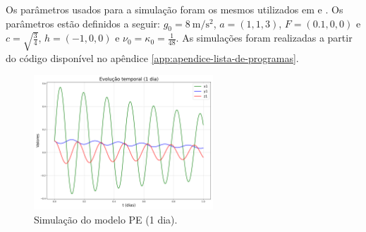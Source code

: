 Os parâmetros usados para a simulação foram os mesmos utilizados em \citet{Lorenz1980} e \cite{Chekroun2021}. Os parâmetros estão definidos a seguir: $g_0 = \SI{8}{\meter\per\square\second}$, $a = (1, 1, 3)$, $F = (0.1, 0, 0)$ e $c = \sqrt{\tfrac{3}{4}}$, $h=(-1, 0, 0)$ e $\nu_0 = \kappa_0 = \frac{1}{48}$. As simulações foram realizadas a partir do código disponível no apêndice \ref{app:apendice-lista-de-programas}.  

\begin{figure}[H]
	\centering
	\includegraphics[width=0.6\textwidth]{00_TCC/01_LATEX/figuras/ch01_lorenz_80/evolucao_temporal_01.png}
	\caption{Simulação do modelo PE (1 dia).\label{fig:lorenz80_pe_1}}
\end{figure}
